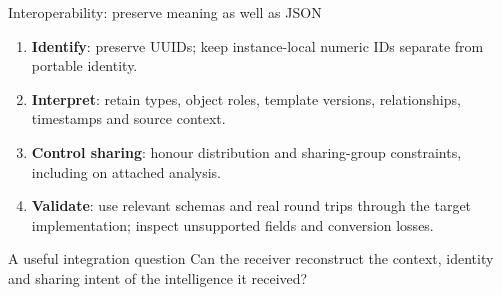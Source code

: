 \begin{frame}{Interoperability: preserve meaning as well as JSON}
\begin{enumerate}
  \item \textbf{Identify}: preserve UUIDs; keep instance-local numeric IDs separate from portable identity.
  \item \textbf{Interpret}: retain types, object roles, template versions, relationships, timestamps and source context.
  \item \textbf{Control sharing}: honour distribution and sharing-group constraints, including on attached analysis.
  \item \textbf{Validate}: use relevant schemas and real round trips through the target implementation; inspect unsupported fields and conversion losses.
\end{enumerate}
\begin{block}{A useful integration question}
Can the receiver reconstruct the context, identity and sharing intent of the intelligence it received?
\end{block}
\end{frame}

